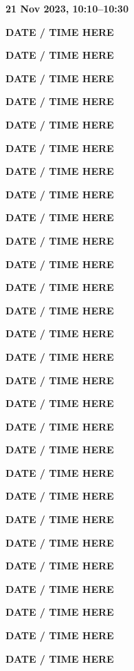 \documentclass[12pt]{extbook}
\newcommand{\abstract}[2]{{
\begin{center}
\bfseries #1
\end{center}}
\par
}
\begin{document}
\clearpage


\abstract{21 Nov 2023, 10:10--10:30}{abstracts/Kipfer} %

\abstract{DATE / TIME HERE}{abstracts/Dutoit} %
\abstract{DATE / TIME HERE}{abstracts/Finger} %
\abstract{DATE / TIME HERE}{abstracts/Strauch_Zimmer} %

\abstract{DATE / TIME HERE}{abstracts/Tomonaga} %
\abstract{DATE / TIME HERE}{abstracts/Kim} %
\abstract{DATE / TIME HERE}{abstracts/Jacops} %
\abstract{DATE / TIME HERE}{abstracts/vanLeeuw} %


\abstract{DATE / TIME HERE}{abstracts/Daskalopoulou} %
\abstract{DATE / TIME HERE}{abstracts/Kimani} %
\abstract{DATE / TIME HERE}{abstracts/Mtili} %

\abstract{DATE / TIME HERE}{abstracts/Roques}
\abstract{DATE / TIME HERE}{abstracts/Giroud}
\abstract{DATE / TIME HERE}{abstracts/Lightfoot}


\abstract{DATE / TIME HERE}{abstracts/Iwe}
\abstract{DATE / TIME HERE}{abstracts/Slagter} %


\abstract{DATE / TIME HERE}{abstracts/Marion} %

\abstract{DATE / TIME HERE}{abstracts/Wang} %

\abstract{DATE / TIME HERE}{abstracts/Blanc} %

\abstract{DATE / TIME HERE}{abstracts/Brennwald} %

\abstract{DATE / TIME HERE}{abstracts/Currle} %

\abstract{DATE / TIME HERE}{abstracts/Ortega} %


\abstract{DATE / TIME HERE}{abstracts/GroegerTrampe} %
\abstract{DATE / TIME HERE}{abstracts/vanRooyen} %
\abstract{DATE / TIME HERE}{abstracts/Zhao} %
\abstract{DATE / TIME HERE}{abstracts/Musy} %


\abstract{DATE / TIME HERE}{abstracts/Engelhardt}
\abstract{DATE / TIME HERE}{abstracts/Picard}
\abstract{DATE / TIME HERE}{abstracts/Hillegonds}






\end{document}
